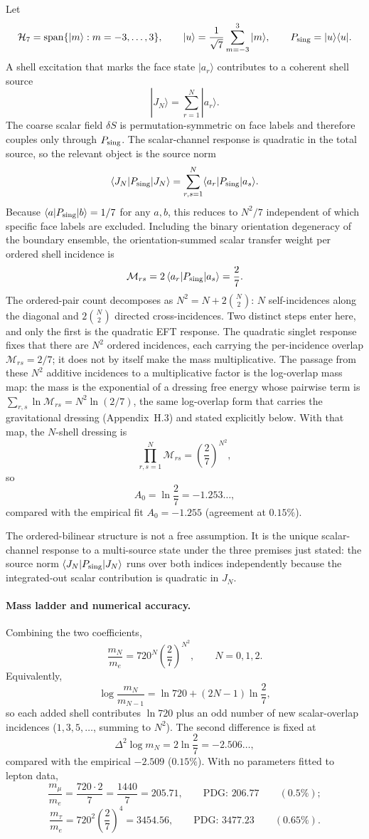 \documentclass[11pt]{article}
\begin{document}
Let
\[
\mathcal H_7=\mathrm{span}\{|m\rangle:m=-3,\ldots,3\},
\qquad
|u\rangle=\frac{1}{\sqrt 7}\sum_{m=-3}^{3}|m\rangle,
\qquad
P_{\rm sing}=|u\rangle\langle u|.
\]
A shell excitation that marks the face state $|a_r\rangle$ contributes to a coherent shell source
\[
|J_N\rangle=\sum_{r=1}^{N}|a_r\rangle.
\]
The coarse scalar field $\delta S$ is permutation-symmetric on face labels and therefore couples only through $P_{\rm sing}$. The scalar-channel response is quadratic in the total source, so the relevant object is the source norm
\[
\langle J_N|P_{\rm sing}|J_N\rangle
=
\sum_{r,s=1}^{N}\langle a_r|P_{\rm sing}|a_s\rangle.
\]
Because $\langle a|P_{\rm sing}|b\rangle=1/7$ for any $a,b$, this reduces to $N^2/7$ independent of which specific face labels are excluded. Including the binary orientation degeneracy of the boundary ensemble, the orientation-summed scalar transfer weight per ordered shell incidence is
\[
\mathcal M_{rs}=2\,\langle a_r|P_{\rm sing}|a_s\rangle=\frac{2}{7}.
\]
The ordered-pair count decomposes as $N^2=N+2\binom{N}{2}$: $N$ self-incidences along the diagonal and $2\binom{N}{2}$ directed cross-incidences. Two distinct steps enter here, and only the first is the quadratic EFT response. The quadratic singlet response fixes that there are $N^2$ ordered incidences, each carrying the per-incidence overlap $\mathcal M_{rs}=2/7$; it does not by itself make the mass multiplicative. The passage from these $N^2$ additive incidences to a multiplicative factor is the log-overlap mass map: the mass is the exponential of a dressing free energy whose pairwise term is $\sum_{r,s}\ln\mathcal M_{rs}=N^2\ln(2/7)$, the same log-overlap form that carries the gravitational dressing (Appendix~H.3) and stated explicitly below. With that map, the $N$-shell dressing is
\[
\prod_{r,s=1}^{N}\mathcal M_{rs}=\left(\frac{2}{7}\right)^{N^2},
\]
so
\[
A_0=\ln\frac{2}{7}=-1.253\ldots,
\]
compared with the empirical fit $A_0=-1.255$ (agreement at $0.15\%$).

The ordered-bilinear structure is not a free assumption. It is the unique scalar-channel response to a multi-source state under the three premises just stated: the source norm $\langle J_N|P_{\rm sing}|J_N\rangle$ runs over both indices independently because the integrated-out scalar contribution is quadratic in $J_N$.

\paragraph{Mass ladder and numerical accuracy.}
Combining the two coefficients,
\[
\boxed{
\frac{m_N}{m_e}=720^N\left(\frac{2}{7}\right)^{N^2},
\qquad N=0,1,2.
}
\]
Equivalently,
\[
\log\frac{m_N}{m_{N-1}}=\ln 720+(2N-1)\ln\frac{2}{7},
\]
so each added shell contributes $\ln 720$ plus an odd number of new scalar-overlap incidences ($1,3,5,\ldots$, summing to $N^2$). The second difference is fixed at
\[
\Delta^2\log m_N=2\ln\frac{2}{7}=-2.506\ldots,
\]
compared with the empirical $-2.509$ ($0.15\%$). With no parameters fitted to lepton data,
\[
\frac{m_\mu}{m_e}=\frac{720\cdot 2}{7}=\frac{1440}{7}=205.71,\qquad
\text{PDG: }206.77\qquad(0.5\%);
\]
\[
\frac{m_\tau}{m_e}=720^2\left(\frac{2}{7}\right)^4=3454.56,\qquad
\text{PDG: }3477.23\qquad(0.65\%).
\]
\end{document}
